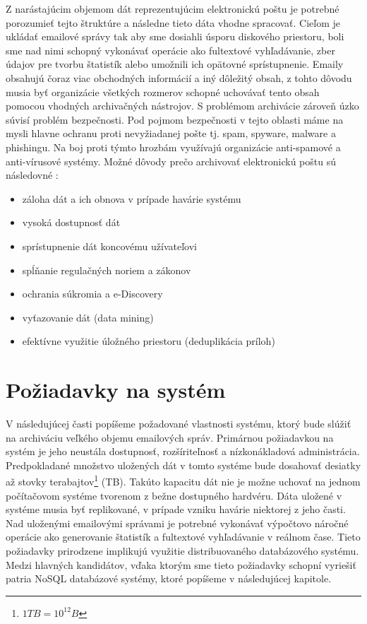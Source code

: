 \documentclass[11pt,twoside,a4paper]{book}
\begin{document}
Z narástajúcim objemom dát reprezentujúcim elektronickú poštu je potrebné porozumieť tejto štruktúre a následne tieto dáta vhodne spracovať. Cieľom je ukládať emailové správy tak aby sme dosiahli úsporu diskového priestoru, boli sme nad nimi schopný vykonávať operácie ako fultextové vyhľadávanie, zber údajov pre tvorbu štatistík alebo umožnili ich opätovné sprístupnenie. Emaily obsahujú čoraz viac obchodných informácií a iný dôležitý obsah, z tohto dôvodu musia byť organizácie všetkých rozmerov schopné uchovávať tento obsah pomocou vhodných archivačných nástrojov. S problémom archivácie zároveň úzko súvisí problém bezpečnosti. Pod pojmom bezpečnosti v tejto oblasti máme na mysli hlavne ochranu proti nevyžiadanej pošte tj. spam, spyware, malware a phishingu. Na boj proti týmto hrozbám využívajú organizácie anti-spamové a anti-vírusové systémy. Možné dôvody prečo archivovať elektronickú poštu sú následovné \cite{WhyArchiving}:
\begin{itemize}
 \item 
  záloha dát a ich obnova v prípade havárie systému
 \item
  vysoká dostupnosť dát
 \item
  sprístupnenie dát koncovému užívateľovi
 \item
  spĺňanie regulačných noriem a zákonov
 \item
  ochrania súkromia a e-Discovery
 \item
  vyťazovanie dát (data mining)
 \item
  efektívne využitie úložného priestoru (deduplikácia príloh)
\end{itemize}


\section{Požiadavky na systém}

V následujúcej časti popíšeme požadované vlastnosti systému, ktorý bude slúžiť na archiváciu veľkého objemu emailových správ. Primárnou požiadavkou na systém je jeho neustála dostupnosť, rozšíriteľnosť a nízkonákladová administrácia. Predpokladané množstvo uložených dát v tomto systéme bude dosahovať desiatky až stovky terabajtov\footnote{$1 TB = 10^{12} B$} (TB). Takúto kapacitu dát nie je možne uchovať na jednom počítačovom systéme tvorenom z bežne dostupného hardvéru. Dáta uložené v systéme musia byť replikované, v prípade vzniku havárie niektorej z jeho časti. Nad uloženými emailovými správami je potrebné vykonávať výpočtovo náročné operácie ako generovanie štatistík a fultextové vyhľadávanie v reálnom čase. Tieto požiadavky prirodzene implikujú využitie distribuovaného databázového systému. Medzi hlavných kandidátov, vďaka ktorým sme tieto požiadavky schopní vyriešiť patria NoSQL databázové systémy, ktoré popíšeme v následujúcej kapitole.
\end{document}
